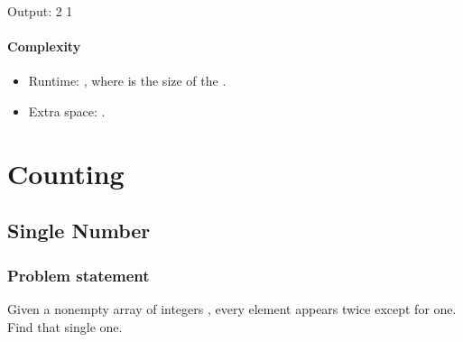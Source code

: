 \documentclass[letterpaper,12pt,english]{book}
\begin{document}
\begin{sphinxVerbatim}[commandchars=\\\{\}]
\end{sphinxVerbatim}

\begin{sphinxVerbatim}[commandchars=\\\{\}]
Output:
2
1
\end{sphinxVerbatim}


\subsubsection{Complexity}
\label{\detokenize{Dynamic_Programming/05_DP_63_Unique_Paths_II:complexity}}\begin{itemize}
\item {} 
\sphinxAtStartPar
Runtime: , where  is the size of the .

\item {} 
\sphinxAtStartPar
Extra space: .

\end{itemize}

\sphinxstepscope


\chapter{Counting}
\label{\detokenize{Counting/index:counting}}\label{\detokenize{Counting/index::doc}}
\sphinxstepscope


\section{Single Number}
\label{\detokenize{Counting/136_Single_Number:single-number}}\label{\detokenize{Counting/136_Single_Number::doc}}

\subsection{Problem statement\sphinxfootnotemark[100]}
\label{\detokenize{Counting/136_Single_Number:problem-statement}}%
\begin{footnotetext}[100]\sphinxAtStartFootnote
{}
%
\end{footnotetext}\ignorespaces 
\sphinxAtStartPar
Given a non\sphinxhyphen{}empty array of integers , every element appears twice except for one. Find that single one.
\end{document}
